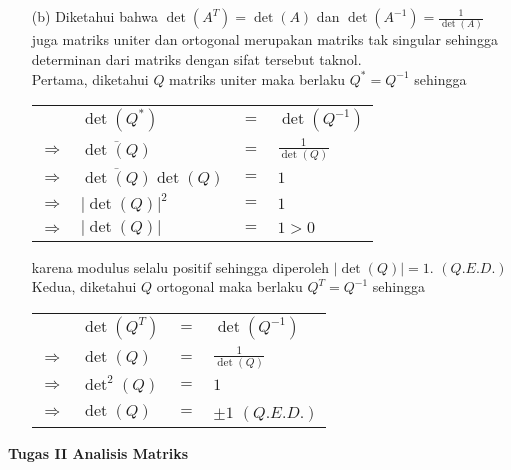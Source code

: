 \documentclass[11pt,a4paper]{article}
\newcommand{\ds}{\displaystyle}
\theoremstyle{plain}
\theoremstyle{definition}
\theoremstyle{remark}
\begin{document}
\begin{enumerate}
\begin{enumerate}
\begin{enumerate}
			\item[(b)] Diketahui bahwa $\det(A^{T})=\det(A)$ dan $\det(A^{-1})=\ds \frac{1}{\det(A)}$ juga matriks uniter dan ortogonal merupakan matriks tak singular sehingga determinan dari matriks dengan sifat tersebut taknol.\\
			Pertama, diketahui $Q$ matriks uniter maka berlaku $Q^{*}=Q^{-1}$ sehingga
			\begin{center}
				\begin{tabular}{llll}
				& $\det(Q^*)$                 & $=$ & $\det(Q^{-1})$                    \\
				$\Rightarrow$ & $\overline{\det(Q)}$        & $=$ & $\displaystyle \frac{1}{\det(Q)}$ \\
				$\Rightarrow$ & $\overline{\det(Q)}\det(Q)$ & $=$ & $1$                               \\
				$\Rightarrow$ & $\left| \det(Q)\right|^{2}$ & $=$ & $1$                               \\
				$\Rightarrow$ & $\left| \det(Q)\right|$     & $=$ & $1>0$                              
			\end{tabular}
			\end{center}
			karena modulus selalu positif sehingga diperoleh $\left|\det(Q)\right|=1$. $(Q.E.D.)$\\
			Kedua, diketahui $Q$ ortogonal maka berlaku $Q^{T}=Q^{-1}$ sehingga
			\begin{center}
				\begin{tabular}{llll}
					& $\det(Q^T)$   & $=$ & $\det(Q^{-1})$                    \\
					$\Rightarrow$ & $\det(Q)$     & $=$ & $\displaystyle \frac{1}{\det(Q)}$ \\
					$\Rightarrow$ & $\det^{2}(Q)$ & $=$ & $1$                               \\
					$\Rightarrow$ & $\det(Q)$     & $=$ & $\pm 1$   $(Q.E.D.)$                          
				\end{tabular}
			\end{center}
	\end{enumerate}
		
	\end{enumerate}
	








\newpage 

\begin{center}
	\textbf{Tugas II Analisis Matriks}
\end{center}



\end{enumerate}
\end{document}
